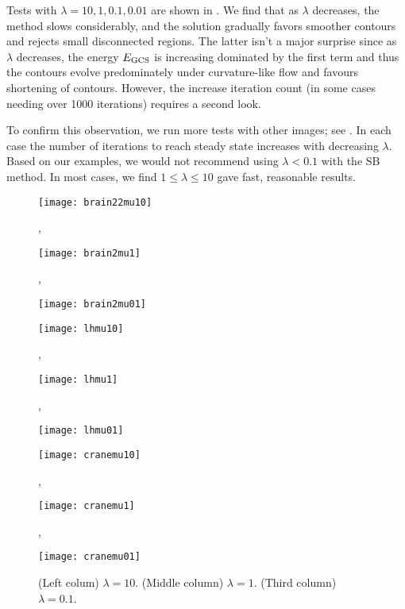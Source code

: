 Tests with $\lambda = 10, 1, 0.1, 0.01$ are shown in . We find that as $\lambda$ decreases, the method slows considerably, and the solution gradually favors smoother contours and rejects small disconnected regions. The latter isn't a major surprise since as $\lambda$ decreases, the energy $E_\textrm{GCS}$ is increasing dominated by the first term and thus the contours evolve predominately under curvature-like flow and favours shortening of contours. However, the increase iteration count (in some cases needing over 1000 iterations) requires a second look. 

To confirm this observation, we run more tests with other images; see . In each case the number of iterations to reach steady state increases with decreasing $\lambda$. Based on our examples, we would not recommend using $\lambda < 0.1$ with the SB method. In most cases, we find $1 \leq \lambda\leq 10$ gave fast, reasonable results.


\begin{figure}[htb!]
	\centering
	\begin{minipage}{0.32\textwidth}
		\texttt{[image: brain22mu10]}
	\end{minipage},
	\begin{minipage}{0.32\textwidth}
		\texttt{[image: brain2mu1]}
	\end{minipage},
	\begin{minipage}{0.32\textwidth}
		\texttt{[image: brain2mu01]}
	\end{minipage}
	
	\vspace{6mm}
	
	\begin{minipage}{0.32\textwidth}
		\texttt{[image: lhmu10]}
	\end{minipage},
	\begin{minipage}{0.32\textwidth}
		\texttt{[image: lhmu1]}
	\end{minipage},
	\begin{minipage}{0.32\textwidth}
		\texttt{[image: lhmu01]}
	\end{minipage}
	\vspace{6mm}
	
	\begin{minipage}{0.32\textwidth}
		\texttt{[image: cranemu10]}
	\end{minipage},
	\begin{minipage}{0.32\textwidth}
		\texttt{[image: cranemu1]}
	\end{minipage},
	\begin{minipage}{0.32\textwidth}
		\texttt{[image: cranemu01]}
	\end{minipage}
	\vspace{6mm}
	
	\caption{(Left colum) $\lambda = 10$. (Middle column) $\lambda = 1$. (Third column) $\lambda = 0.1$.}
	\label{fig:sb_sample}
\end{figure}





